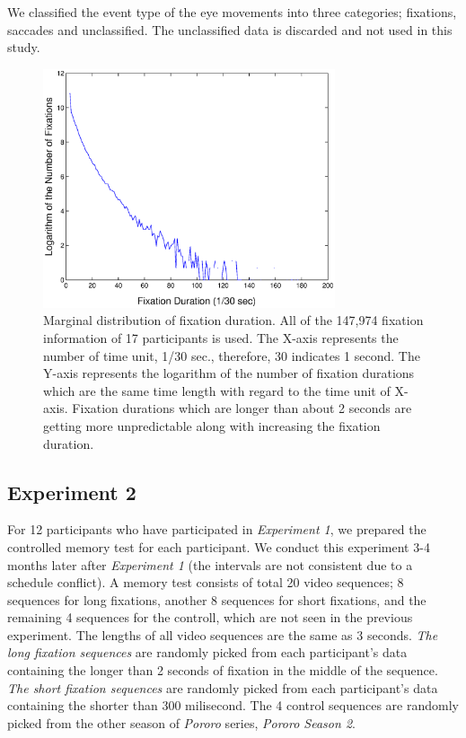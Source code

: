 \documentclass[10pt,letterpaper]{article}
\begin{document}
We classified the event type of the eye movements into three categories; fixations, saccades and unclassified. The unclassified data is discarded and not used in this study.

\begin{figure}
  \centerline{\includegraphics[width=86mm,trim=10mm 3mm 10mm 3mm]{./eps/marginal_fixation_duration.eps}}
  \caption{Marginal distribution of fixation duration. All of the 147,974 fixation information of 17 participants is used. The X-axis represents the number of time unit, 1/30 sec., therefore, 30 indicates 1 second. The Y-axis represents the logarithm of the number of fixation durations which are the same time length with regard to the time unit of X-axis. Fixation durations which are longer than about 2 seconds are getting more unpredictable along with increasing the fixation duration.}
  \label{fig:marginal-fixation-duration}
\end{figure}

\subsection{Experiment 2}

For 12 participants who have participated in \textit{Experiment 1}, we prepared the controlled memory test for each participant. We conduct this experiment 3-4 months later after \textit{Experiment 1} (the intervals are not consistent due to a schedule conflict). A memory test consists of total 20 video sequences; 8 sequences for long fixations, another 8 sequences for short fixations, and the remaining 4 sequences for the controll, which are not seen in the previous experiment. The lengths of all video sequences are the same as 3 seconds. \textit{The long fixation sequences} are randomly picked from each participant's data containing the longer than 2 seconds of fixation in the middle of the sequence. \textit{The short fixation sequences} are randomly picked from each participant's data containing the shorter than 300 milisecond. The 4 control sequences are randomly picked from the other season of \textit{Pororo} series, \textit{Pororo Season 2}.
\end{document}
